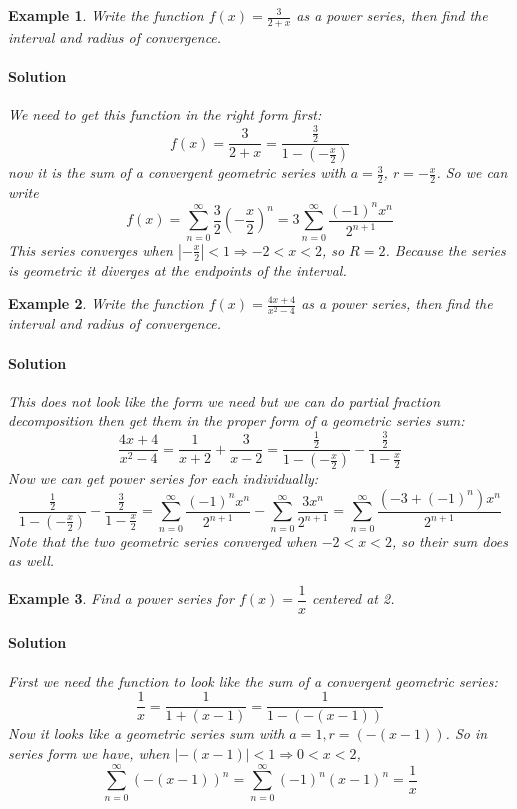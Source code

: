 \documentclass[letterpaper, 11pt, openany]{book}
\theoremstyle{mytheoremstyle}
\theoremstyle{myexamplestyle}
\newtheorem{example}{Example}[section]
\newenvironment{solution}{\paragraph{\sffamily \smaller \fontseries{b}\selectfont Solution}}{\hfill\faSquare}
\begin{document}
\begin{example}\label{e:powseriesgeolike}
    Write the function $\displaystyle f(x) = \frac{3}{2+x}$ as a power series, then find the interval and radius of convergence.
    \begin{solution}
        We need to get this function in the right form first:
        \[f(x) = \frac{3}{2+x} = \frac{\frac{3}{2}}{1 - \left( -\frac{x}{2} \right)}\]
        now it is the sum of a convergent geometric series with $a = \frac{3}{2}$, $r = -\frac{x}{2}$. So we can write        
        \[f(x) = \sum_{n = 0}^{\infty} \frac{3}{2}\left( -\frac{x}{2} \right)^{n} = 3\sum_{n=0}^{\infty} \frac{(-1)^{n} x^{n}}{2^{n+1}}\]
        This series converges when $\left| -\frac{x}{2} \right| < 1 \Rightarrow -2 < x < 2$, so $R=2$. Because the series is geometric it diverges at the endpoints of the interval.
    \end{solution}
\end{example}

\begin{example}\label{e:powseriesparfrac}
    Write the function $\displaystyle f(x) = \frac{4x+4}{x^{2} - 4}$ as a power series, then find the interval and radius of convergence.
    \begin{solution}
        This does not look like the form we need but we can do partial fraction decomposition then get them in the proper form of a geometric series sum: 
        \[\frac{4x+4}{x^{2} - 4} = \frac{1}{x+2} + \frac{3}{x-2} = \frac{\frac{1}{2}}{1-\left( -\frac{x}{2} \right)} - \frac{\frac{3}{2}}{1-\frac{x}{2}}\]
        Now we can get power series for each individually:
        \[\frac{\frac{1}{2}}{1-\left( -\frac{x}{2} \right)} - \frac{\frac{3}{2}}{1-\frac{x}{2}} = \sum_{n=0}^{\infty} \frac{(-1)^{n}x^{n}}{2^{n+1}} - \sum_{n=0}^{\infty} \frac{3x^{n}}{2^{n+1}} = \sum_{n=0}^{\infty} \frac{(-3 + (-1)^{n})x^{n}}{2^{n+1}}\]
        Note that the two geometric series converged when $-2 < x < 2$, so their sum does as well.
    \end{solution}
\end{example}

\begin{example}\label{e:reciprocal-series}
    Find a power series for \(f(x) = \dfrac{1}{x}\) centered at 2.
    \begin{solution}
        First we need the function to look like the sum of a convergent geometric series:
        \[\frac{1}{x} = \frac{1}{1 + (x - 1)} = \frac{1}{1-(-(x-1))}\]
        Now it looks like a geometric series sum with \(a=1, r = (-(x-1))\). So in series form we have, when \(|-(x-1)|< 1 \Rightarrow 0 < x < 2\), 
        \[\sum_{n=0}^{\infty} (-(x-1))^n = \sum_{n=0}^{\infty} (-1)^n (x-1)^n = \frac{1}{x}\]
    \end{solution}
\end{example}
\end{document}
